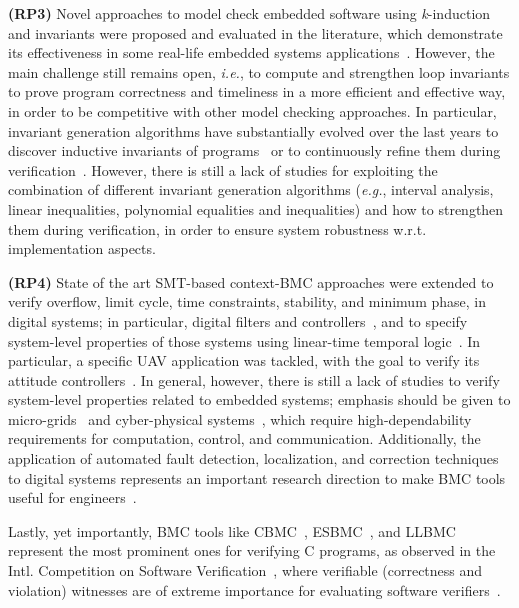 \documentclass{acm_sen_article}
\begin{document}
\textbf{(RP3)} Novel approaches to model check embedded software using \textit{k}-induction and invariants were proposed and evaluated in the literature, which demonstrate its effectiveness in some real-life embedded systems applications~\cite{Gadelha15,Brain15,Rocha15}. However, the main challenge still remains open, {\it i.e.}, to compute and strengthen loop invariants to prove program correctness and timeliness in a more efficient and effective way, in order to be competitive with other model checking approaches. In particular, invariant generation algorithms have substantially evolved over the last years to discover inductive invariants of programs~\cite{pips:2013,Henry:2012} or to continuously refine them during verification~\cite{Beyer15}. However, there is still a lack of studies for exploiting the combination of different invariant generation algorithms ({\it e.g.}, interval analysis, linear inequalities, polynomial equalities and inequalities) and how to strengthen them during verification, in order to ensure system robustness w.r.t. implementation aspects.

\textbf{(RP4)} State of the art SMT-based context-BMC approaches were extended to verify overflow, limit cycle, time constraints, stability, and minimum phase, in digital systems; in particular, digital filters and controllers~\cite{dsv_spin2015,esbmc_controller,esbmc_filter}, and to specify system-level properties of those systems using linear-time temporal logic~\cite{JMorse15}. In particular, a specific UAV application was tackled, with the goal to verify its attitude controllers~\cite{Bessa16}. In general, however, there is still a lack of studies to verify system-level properties related to embedded systems; emphasis should be given to micro-grids~\cite{xu15} and cyber-physical systems~\cite{leeCPS2}, which require high-dependability requirements for computation, control, and communication. Additionally, the application of automated fault detection, localization, and correction techniques to digital systems represents an important research direction to make BMC tools useful for engineers~\cite{Alves15}.

Lastly, yet importantly, BMC tools like CBMC~\cite{Clarke04}, ESBMC~\cite{MorseCNF13,MorseRCN014}, and LLBMC~\cite{MerzFS12} represent the most prominent ones for verifying C programs, as observed in the Intl. Competition on Software Verification~\cite{Beyer14,BeyerSVCOMP15}, where verifiable (correctness and violation) witnesses are of extreme importance for evaluating software verifiers~\cite{BeyerW15,RochaIFM12}.
\end{document}
